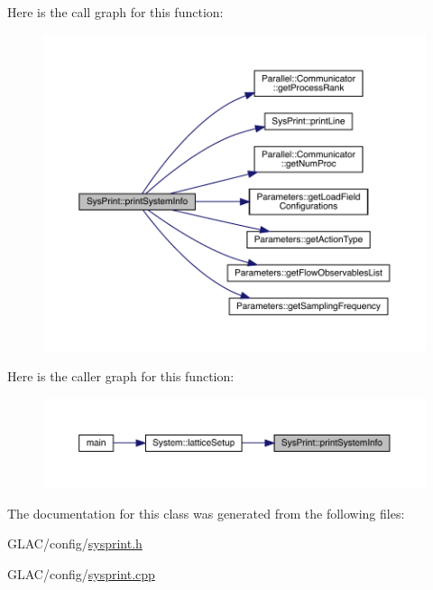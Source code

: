 Here is the call graph for this function\+:\nopagebreak
\begin{figure}[H]
\begin{center}
\leavevmode
\includegraphics[width=350pt]{class_sys_print_a4572572643f6f4685081a3ae419e5ca9_cgraph}
\end{center}
\end{figure}
Here is the caller graph for this function\+:\nopagebreak
\begin{figure}[H]
\begin{center}
\leavevmode
\includegraphics[width=350pt]{class_sys_print_a4572572643f6f4685081a3ae419e5ca9_icgraph}
\end{center}
\end{figure}


The documentation for this class was generated from the following files\+:\begin{DoxyCompactItemize}
\item 
G\+L\+A\+C/config/\mbox{\hyperlink{sysprint_8h}{sysprint.\+h}}\item 
G\+L\+A\+C/config/\mbox{\hyperlink{sysprint_8cpp}{sysprint.\+cpp}}\end{DoxyCompactItemize}
